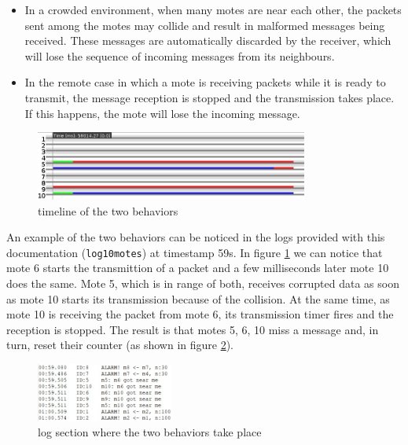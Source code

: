 \documentclass[11pt]{article}
\begin{document}
\begin{itemize}
  \item In a crowded environment, when many motes are near each other, the packets sent among the motes may collide and result in malformed messages being received. These messages are automatically discarded by the receiver, which will lose the sequence of incoming messages from its neighbours.
  \item In the remote case in which a mote is receiving packets while it is ready to transmit, the message reception is stopped and the transmission takes place. If this happens, the mote will lose the incoming message.
\end{itemize}

\begin{figure}[H]
  \centering
  \includegraphics[width=0.8\textwidth]{10-motes-timeline.jpg}
  \caption{timeline of the two behaviors}
  \label{timeline}
\end{figure}

An example of the two behaviors can be noticed in the logs provided with this documentation (\texttt{log10motes}) at timestamp 59s. In figure \ref{timeline} we can notice that mote 6 starts the transmittion of a packet and a few milliseconds later mote 10 does the same. Mote 5, which is in range of both, receives corrupted data as soon as mote 10 starts its transmission because of the collision. \newline
At the same time, as mote 10 is receiving the packet from mote 6, its transmission timer fires and the reception is stopped. \newline
The result is that motes 5, 6, 10 miss a message and, in turn, reset their counter (as shown in figure \ref{log}).

\begin{figure}[H]
  \centering
  \includegraphics[width=0.40\textwidth]{LogTimeline.jpg}
  \caption{log section where the two behaviors take place}
  \label{log}  
\end{figure}
\end{document}
